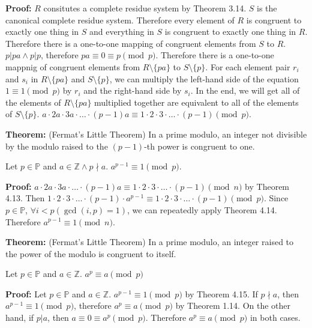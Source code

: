 \textbf{Proof:} \(R\) consitutes a complete residue system by Theorem 3.14. \(S\) is the canonical complete residue system. Therefore every element of \(R\) is congruent to exactly one thing in \(S\) and everything in \(S\) is congruent to exactly one thing in \(R\). Therefore there is a one-to-one mapping of congruent elements from \(S\) to \(R\). \(p|pa \wedge p|p\), therefore \(pa \equiv 0 \equiv p \pmod p\). Therefore there is a one-to-one mappnig of congruent elements from \(R \setminus \{pa\}\) to \(S \setminus \{p\}\). For each element pair \(r_i\) and \(s_i\) in \(R \setminus \{pa\}\) and \(S \setminus \{p\}\), we can multiply the left-hand side of the equation \(1 \equiv 1 \pmod p\) by \(r_i\) and the right-hand side by \(s_i\). In the end, we will get all of the elements of \(R \setminus \{pa\}\) multiplied together are equivalent to all of the elements of \(S \setminus \{p\}\). \(a \cdot 2a \cdot 3a \cdot \dots \cdot (p-1)a \equiv 1 \cdot 2 \cdot 3 \cdot \dots \cdot (p-1) \pmod p\). \qedhere

\item \textbf{Theorem:} (Fermat's Little Theorem) In a prime modulo, an integer not divisible by the modulo raised to the \((p-1)\)-th power is congruent to one.

Let \(p \in \mathbb P\) and \(a \in \mathbb Z \wedge p \nmid a\). \(a^{p-1} \equiv 1 \pmod p\).

\textbf{Proof:} \(a \cdot 2a \cdot 3a \cdot \dots \cdot (p-1)a \equiv 1 \cdot 2 \cdot 3 \cdot \dots \cdot (p-1) \pmod n\) by Theorem 4.13. Then \(1 \cdot 2 \cdot 3 \cdot \dots \cdot (p-1) \cdot a^{p-1} \equiv 1 \cdot 2 \cdot 3 \cdot \dots \cdot (p-1) \pmod p\). Since \(p \in \mathbb P\), \(\forall i < p (\gcd(i, p) = 1)\), we can repeatedly apply Theorem 4.14. Therefore \(a^{p-1} \equiv 1 \pmod n\). \qedhere

\item \textbf{Theorem:} (Fermat's Little Theorem) In a prime modulo, an integer raised to the power of the modulo is congruent to itself.

Let \(p \in \mathbb P\) and \(a \in \mathbb Z\). \(a^p \equiv a \pmod p\)

\textbf{Proof:} Let \(p \in \mathbb P\) and \(a \in \mathbb Z\). \(a^{p-1} \equiv 1 \pmod p\) by Theorem 4.15. If \(p \nmid a\), then \(a^{p-1} \equiv 1 \pmod p\), therefore \(a^p \equiv a \pmod p\) by Theorem 1.14. On the other hand, if \(p | a\), then \(a \equiv 0 \equiv a^p \pmod p\). Therefore \(a^p \equiv a \pmod p\) in both cases.

